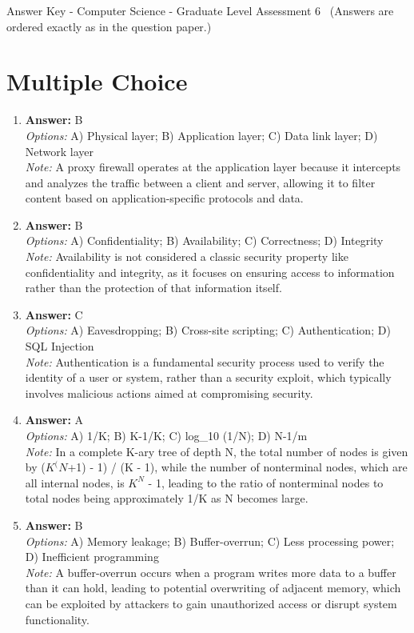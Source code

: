 \documentclass[12pt]{article}
\begin{document}
\begin{center}
Answer Key - Computer Science - Graduate Level Assessment 6 \
\small (Answers are ordered exactly as in the question paper.)
\end{center}

\section*{Multiple Choice}
\begin{enumerate}[label=\arabic*.]
\item \textbf{Answer:} B
\\ \textit{Options:} A) Physical layer; B) Application layer; C) Data link layer; D) Network layer
\\ \textit{Note:} A proxy firewall operates at the application layer because it intercepts and analyzes the traffic between a client and server, allowing it to filter content based on application-specific protocols and data.
\item \textbf{Answer:} B
\\ \textit{Options:} A) Confidentiality; B) Availability; C) Correctness; D) Integrity
\\ \textit{Note:} Availability is not considered a classic security property like confidentiality and integrity, as it focuses on ensuring access to information rather than the protection of that information itself.
\item \textbf{Answer:} C
\\ \textit{Options:} A) Eavesdropping; B) Cross-site scripting; C) Authentication; D) SQL Injection
\\ \textit{Note:} Authentication is a fundamental security process used to verify the identity of a user or system, rather than a security exploit, which typically involves malicious actions aimed at compromising security.
\item \textbf{Answer:} A
\\ \textit{Options:} A) 1/K; B) K-1/K; C) log\_10 (1/N); D) N-1/m
\\ \textit{Note:} In a complete K-ary tree of depth N, the total number of nodes is given by ($K^(N$+1) - 1) / (K - 1), while the number of nonterminal nodes, which are all internal nodes, is $K^N$ - 1, leading to the ratio of nonterminal nodes to total nodes being approximately 1/K as N becomes large.
\item \textbf{Answer:} B
\\ \textit{Options:} A) Memory leakage; B) Buffer-overrun; C) Less processing power; D) Inefficient programming
\\ \textit{Note:} A buffer-overrun occurs when a program writes more data to a buffer than it can hold, leading to potential overwriting of adjacent memory, which can be exploited by attackers to gain unauthorized access or disrupt system functionality.
\end{enumerate}
\end{document}
